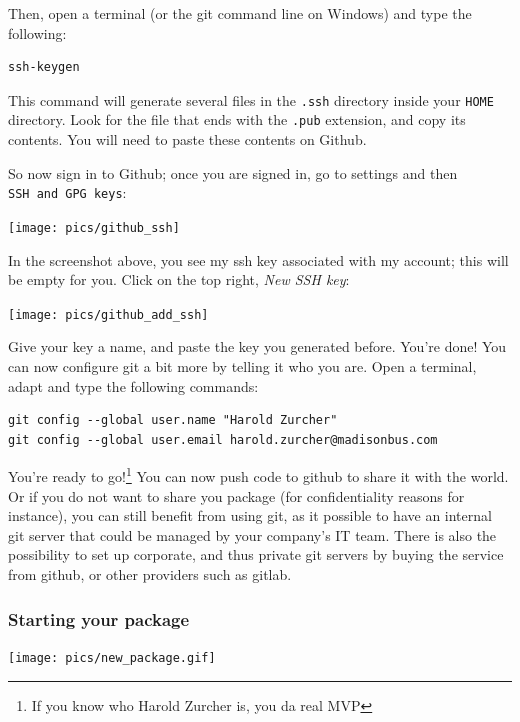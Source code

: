 \documentclass[
]{article}
\begin{document}
Then, open a terminal (or the git command line on Windows) and type the following:

\begin{verbatim}
ssh-keygen
\end{verbatim}

This command will generate several files in the \texttt{.ssh} directory inside your \texttt{HOME} directory. Look
for the file that ends with the \texttt{.pub} extension, and copy its contents. You will need to paste
these contents on Github.

So now sign in to Github; once you are signed in, go to settings and then \texttt{SSH\ and\ GPG\ keys}:

\texttt{[image: pics/github\_ssh]}

In the screenshot above, you see my ssh key associated with my account; this will be empty for you.
Click on the top right, \emph{New SSH key}:

\texttt{[image: pics/github\_add\_ssh]}

Give your key a name, and paste the key you generated before. You're done! You can now configure
git a bit more by telling it who you are. Open a terminal, adapt and type the following commands:

\begin{verbatim}
git config --global user.name "Harold Zurcher"
git config --global user.email harold.zurcher@madisonbus.com
\end{verbatim}

You're ready to go!\footnote{If you know who Harold Zurcher is, you da real MVP}
You can now push code to github to share it with the world. Or if you do not want
to share you package (for confidentiality reasons for instance), you can still benefit from using
git, as it possible to have an internal git server that could be managed by your company's IT team.
There is also the possibility to set up corporate, and thus private git servers by buying the service
from github, or other providers such as gitlab.

\hypertarget{starting-your-package}{%
\subsubsection{Starting your package}\label{starting-your-package}}

\texttt{[image: pics/new\_package.gif]}
\end{document}
